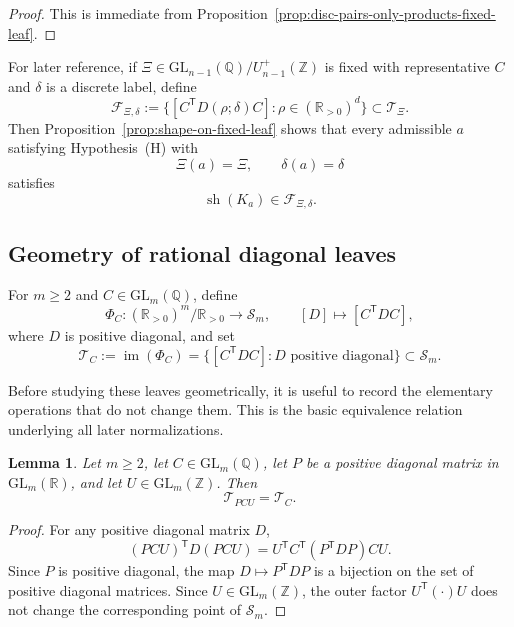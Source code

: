 \documentclass[11pt,letterpaper]{amsart}
\newcommand{\Q}{\mathbb{Q}}
\newcommand{\Z}{\mathbb{Z}}
\newcommand{\R}{\mathbb{R}}
\newcommand{\GL}{\mathrm{GL}}
\theoremstyle{plain}
\newtheorem{lemma}[theorem]{Lemma}
\theoremstyle{definition}
\begin{document}
\begin{proof}
This is immediate from Proposition~\ref{prop:disc-pairs-only-products-fixed-leaf}.
\end{proof}

For later reference, if \(\Xi\in \GL_{n-1}(\Q)/U_{n-1}^+(\Z)\) is fixed with
representative \(C\) and \(\delta\) is a discrete label, define
\begin{equation}\label{eq:F-Xi-delta-lite}
\mathcal F_{\Xi,\delta}
:=
\bigl\{
[C^{\mathsf T}D(\rho;\delta)C]:
\rho\in (\R_{>0})^d
\bigr\}
\subset \mathscr T_{\Xi}.
\end{equation}
Then Proposition~\ref{prop:shape-on-fixed-leaf} shows that every admissible
\(a\) satisfying Hypothesis~\textup{(H)} with
\[
\Xi(a)=\Xi,
\qquad
\delta(a)=\delta
\]
satisfies
\[
\operatorname{sh}(K_a)\in \mathcal F_{\Xi,\delta}.
\]

\subsection{Geometry of rational diagonal leaves}

For \(m\ge 2\) and \(C\in \GL_m(\Q)\), define
\[
\Phi_C:(\R_{>0})^m/\R_{>0}\longrightarrow \mathscr S_m,
\qquad
[D]\longmapsto [C^{\mathsf T}DC],
\]
where \(D\) is positive diagonal, and set
\begin{equation}\label{eq:type-locus-fixed-C}
\mathcal T_C
:=
\operatorname{im}(\Phi_C)
=
\{[C^{\mathsf T}DC]: D\text{ positive diagonal}\}
\subset \mathscr S_m.
\end{equation}

Before studying these leaves geometrically, it is useful to record the elementary operations that do not change them. This is the basic equivalence relation underlying all later normalizations.

\begin{lemma}
\label{lem:leaf-equivalence-PCU}
Let \(m\ge 2\), let \(C\in \GL_m(\Q)\), let \(P\) be a positive diagonal matrix
in \(\GL_m(\R)\), and let \(U\in \GL_m(\Z)\). Then
\[
\mathcal T_{PCU}=\mathcal T_C.
\]
\end{lemma}

\begin{proof}
For any positive diagonal matrix \(D\),
\[
(PCU)^{\mathsf T}D(PCU)
=
U^{\mathsf T}C^{\mathsf T}(P^{\mathsf T}DP)CU.
\]
Since \(P\) is positive diagonal, the map \(D\mapsto P^{\mathsf T}DP\) is a
bijection on the set of positive diagonal matrices.  Since
\(U\in \GL_m(\Z)\), the outer factor \(U^{\mathsf T}(\cdot)U\) does not change
the corresponding point of \(\mathscr S_m\).
\end{proof}
\end{document}
